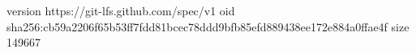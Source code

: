 version https://git-lfs.github.com/spec/v1
oid sha256:cb59a2206f65b53ff7fdd81bcec78ddd9bfb85efd889438ee172e884a0ffae4f
size 149667
